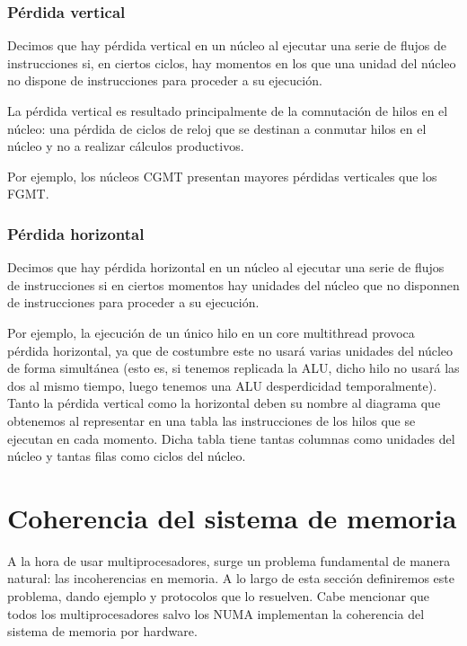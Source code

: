 \subsubsection{Pérdida vertical}
Decimos que hay pérdida vertical en un núcleo al ejecutar una serie de flujos de instrucciones si, en ciertos ciclos, hay momentos en los que una unidad del núcleo no dispone de instrucciones para proceder a su ejecución. 

La pérdida vertical es resultado principalmente de la comnutación de hilos en el núcleo: una pérdida de ciclos de reloj que se destinan a conmutar hilos en el núcleo y no a realizar cálculos productivos.

Por ejemplo, los núcleos CGMT presentan mayores pérdidas verticales que los FGMT.

\subsubsection{Pérdida horizontal}
Decimos que hay pérdida horizontal en un núcleo al ejecutar una serie de flujos de instrucciones si en ciertos momentos hay unidades del núcleo que no disponnen de instrucciones para proceder a su ejecución.

Por ejemplo, la ejecución de un único hilo en un core multithread provoca pérdida horizontal, ya que de costumbre este no usará varias unidades del núcleo de forma simultánea (esto es, si tenemos replicada la ALU, dicho hilo no usará las dos al mismo tiempo, luego tenemos una ALU desperdicidad temporalmente).\\

Tanto la pérdida vertical como la horizontal deben su nombre al diagrama que obtenemos al representar en una tabla las instrucciones de los hilos que se ejecutan en cada momento. Dicha tabla tiene tantas columnas como unidades del núcleo y tantas filas como ciclos del núcleo.

\newpage
\section{Coherencia del sistema de memoria}
A la hora de usar multiprocesadores, surge un problema fundamental de manera natural: las incoherencias en memoria. A lo largo de esta sección definiremos este problema, dando ejemplo y protocolos que lo resuelven. Cabe mencionar que todos los multiprocesadores salvo los NUMA implementan la coherencia del sistema de memoria por hardware.

